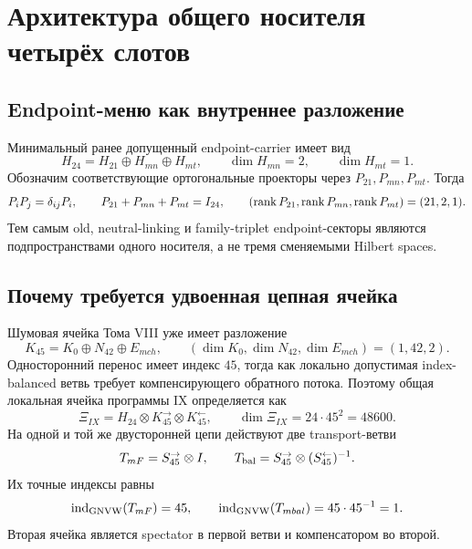\chapter{Архитектура общего носителя четырёх слотов}
\label{ch:v9-four-slot-common-carrier}

\section{Endpoint-меню как внутреннее разложение}

Минимальный ранее допущенный endpoint-carrier имеет вид
\begin{equation}
 H_{24}=H_{21}\oplus H_{
m n}\oplus H_{
m t},
 \qquad \dim H_{
m n}=2,
 \qquad \dim H_{
m t}=1.
 \label{eq:v9-common-carrier-endpoint-splitting}
\end{equation}
Обозначим соответствующие ортогональные проекторы через
$P_{21},P_{
m n},P_{
m t}$. Тогда
\begin{equation}
 P_iP_j=\delta_{ij}P_i,
 \qquad P_{21}+P_{
m n}+P_{
m t}=I_{24},
 \qquad (\operatorname{rank} P_{21},\operatorname{rank} P_{
m n},\operatorname{rank} P_{
m t})=(21,2,1).
 \label{eq:v9-common-carrier-endpoint-projectors}
\end{equation}
Тем самым old, neutral-linking и family-triplet endpoint-секторы являются
подпространствами одного носителя, а не тремя сменяемыми Hilbert spaces.

\section{Почему требуется удвоенная цепная ячейка}

Шумовая ячейка Тома VIII уже имеет разложение
\begin{equation}
 K_{45}=K_0\oplus N_{42}\oplus E_{
m ch},
 \qquad (\dim K_0,\dim N_{42},\dim E_{
m ch})=(1,42,2).
 \label{eq:v9-common-carrier-noise-cell}
\end{equation}
Односторонний перенос имеет индекс $45$, тогда как локально допустимая
index-balanced ветвь требует компенсирующего обратного потока. Поэтому
общая локальная ячейка программы IX определяется как
\begin{equation}
 \Xi_{IX}=H_{24}\otimes K_{45}^{\rightarrow}
 \otimes K_{45}^{\leftarrow},
 \qquad \dim\Xi_{IX}=24\cdot45^2=48600.
 \label{eq:v9-common-carrier-xi}
\end{equation}
На одной и той же двусторонней цепи действуют две transport-ветви
\begin{equation}
 T_{
m F}=S_{45}^{\rightarrow}\otimes I,
 \qquad
 T_{\rm bal}=S_{45}^{\rightarrow}\otimes
 (S_{45}^{\leftarrow})^{-1}.
 \label{eq:v9-common-carrier-transport-menu}
\end{equation}
Их точные индексы равны
\begin{equation}
 \operatorname{ind}_{\rm GNVW}(T_{
m F})=45,
 \qquad
 \operatorname{ind}_{\rm GNVW}(T_{
m bal})=45\cdot45^{-1}=1.
 \label{eq:v9-common-carrier-transport-indices}
\end{equation}
Вторая ячейка является spectator в первой ветви и компенсатором во второй.

